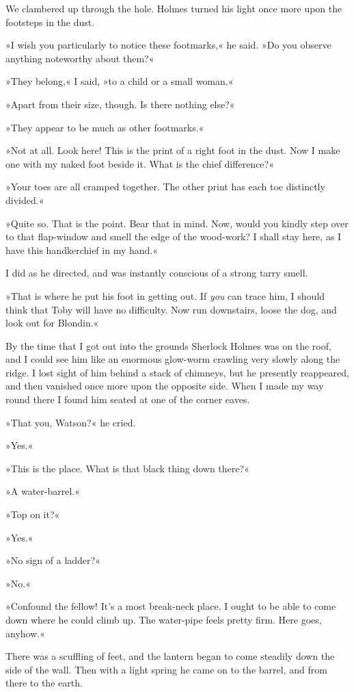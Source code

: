 We clambered up through the hole. Holmes turned his light once more upon the footsteps in the dust.

»I wish you particularly to notice these footmarks,« he said. »Do you observe anything noteworthy about them?«

»They belong,« I said, »to a child or a small woman.«

»Apart from their size, though. Is there nothing else?«

»They appear to be much as other footmarks.«

»Not at all. Look here! This is the print of a right foot in the dust. Now I make one with my naked foot beside it. What is the chief difference?«

»Your toes are all cramped together. The other print has each toe distinctly divided.«

»Quite so. That is the point. Bear that in mind. Now, would you kindly step over to that flap-window and smell the edge of the wood-work? I shall stay here, as I have this handkerchief in my hand.«

I did as he directed, and was instantly conscious of a strong tarry smell.

»That is where he put his foot in getting out. If \textit{you} can trace him, I should think that Toby will have no difficulty. Now run downstairs, loose the dog, and look out for Blondin.«

By the time that I got out into the grounds Sherlock Holmes was on the roof, and I could see him like an enormous glow-worm crawling very slowly along the ridge. I lost sight of him behind a stack of chimneys, but he presently reappeared, and then vanished once more upon the opposite side. When I made my way round there I found him seated at one of the corner eaves.

»That you, Watson?« he cried.

»Yes.«

»This is the place. What is that black thing down there?«

»A water-barrel.«

»Top on it?«

»Yes.«

»No sign of a ladder?«

»No.«

»Confound the fellow! It's a most break-neck place. I ought to be able to come down where he could climb up. The water-pipe feels pretty firm. Here goes, anyhow.«

There was a scuffling of feet, and the lantern began to come steadily down the side of the wall. Then with a light spring he came on to the barrel, and from there to the earth.

